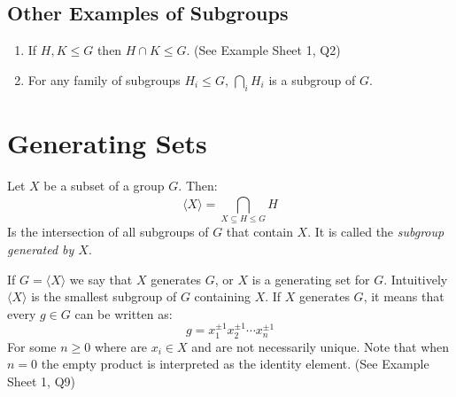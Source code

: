\documentclass[../main.tex]{subfiles}
\begin{document}
\subsection{Other Examples of Subgroups}
\begin{example}
  \begin{enumerate}
    \item If $H, K \leq G$ then $H \cap K \leq G$. (See Example Sheet 1, Q2)
    \item For any family of subgroups $H_i \leq G$, $\bigcap_{i}^{} H_i$ is a subgroup of $G$.
  \end{enumerate}
\end{example}
\section{Generating Sets}
\begin{definition}
  Let $X$ be a subset of a group $G$. Then:
  \[
    \langle X \rangle = \bigcap_{X \subseteq H \leq G}^{} H
  \]
  Is the intersection of all subgroups of $G$ that contain $X$.
  It is called the \textit{subgroup generated by $X$}.
\end{definition}
If $G = \langle X \rangle$ we say that $X$ generates $G$, or $X$ is a generating set for $G$.
Intuitively $\langle X \rangle$ is the smallest subgroup of $G$ containing $X$.
If $X$ generates $G$, it means that every $g \in G$ can be written as:
\[
  g = x^{\pm 1}_{1} x^{\pm 1}_{2} \cdots x^{\pm 1}_{n}
\]
For some $n \geq 0$ where are $x_i \in X$ and are not necessarily unique.
Note that when $n=0$ the empty product is interpreted as the identity element. (See Example Sheet 1, Q9)
\end{document}
